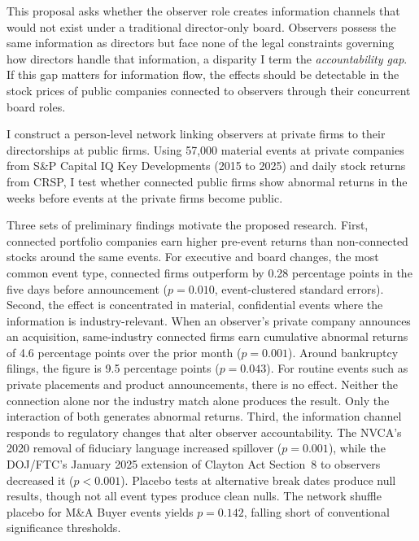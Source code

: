\documentclass[12pt]{article}
\begin{document}
This proposal asks whether the observer role creates information channels that would not exist under a traditional director-only board. Observers possess the same information as directors but face none of the legal constraints governing how directors handle that information, a disparity I term the \textit{accountability gap}. If this gap matters for information flow, the effects should be detectable in the stock prices of public companies connected to observers through their concurrent board roles.

I construct a person-level network linking observers at private firms to their directorships at public firms. Using 57,000 material events at private companies from S\&P Capital IQ Key Developments (2015 to 2025) and daily stock returns from CRSP, I test whether connected public firms show abnormal returns in the weeks before events at the private firms become public.

Three sets of preliminary findings motivate the proposed research. First, connected portfolio companies earn higher pre-event returns than non-connected stocks around the same events. For executive and board changes, the most common event type, connected firms outperform by 0.28 percentage points in the five days before announcement ($p=0.010$, event-clustered standard errors). Second, the effect is concentrated in material, confidential events where the information is industry-relevant. When an observer's private company announces an acquisition, same-industry connected firms earn cumulative abnormal returns of 4.6 percentage points over the prior month ($p=0.001$). Around bankruptcy filings, the figure is 9.5 percentage points ($p=0.043$). For routine events such as private placements and product announcements, there is no effect. Neither the connection alone nor the industry match alone produces the result. Only the interaction of both generates abnormal returns. Third, the information channel responds to regulatory changes that alter observer accountability. The NVCA's 2020 removal of fiduciary language increased spillover ($p=0.001$), while the DOJ/FTC's January 2025 extension of Clayton Act Section~8 to observers decreased it ($p<0.001$). Placebo tests at alternative break dates produce null results, though not all event types produce clean nulls. The network shuffle placebo for M\&A Buyer events yields $p=0.142$, falling short of conventional significance thresholds.
\end{document}
